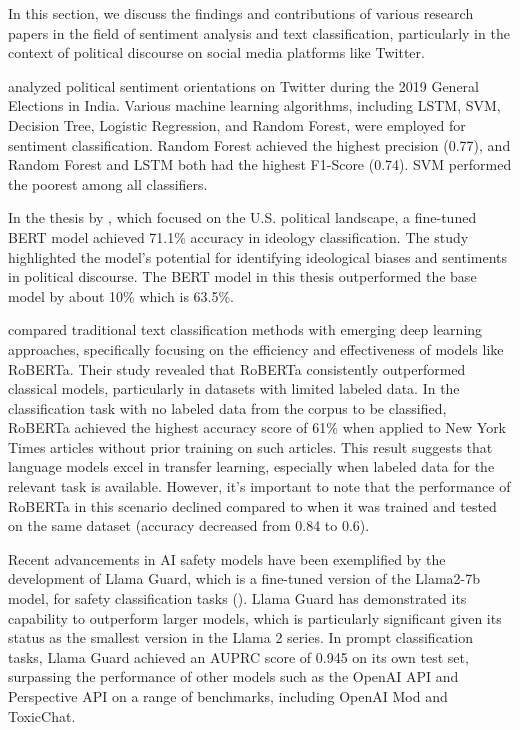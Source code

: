 \documentclass[10pt]{article}
\begin{document}
\begin{multicols}{2}
In this section, we discuss the findings and contributions of various research papers in the field of sentiment analysis and text classification, particularly in the context of political discourse on social media platforms like Twitter.

\cite{ANSARI20201821} analyzed political sentiment orientations on Twitter during the 2019 General Elections in India. Various machine learning algorithms, including LSTM, SVM, Decision Tree, Logistic Regression, and Random Forest, were employed for sentiment classification. Random Forest achieved the highest precision (0.77), and Random Forest and LSTM both had the highest F1-Score (0.74). SVM performed the poorest among all classifiers.

In the thesis by \cite{ahmed2021nlp}, which focused on the U.S. political landscape, a fine-tuned BERT model achieved 71.1\% accuracy in ideology classification. The study highlighted the model's potential for identifying ideological biases and sentiments in political discourse. The BERT model in this thesis outperformed the base model by about 10\% which is 63.5\%.

\cite{Terechshenko2020} compared traditional text classification methods with emerging deep learning approaches, specifically focusing on the efficiency and effectiveness of models like RoBERTa. Their study revealed that RoBERTa consistently outperformed classical models, particularly in datasets with limited labeled data. In the classification task with no labeled data from the corpus to be classified, RoBERTa achieved the highest accuracy score of 61\% when applied to New York Times articles without prior training on such articles. This result suggests that language models excel in transfer learning, especially when labeled data for the relevant task is available. However, it's important to note that the performance of RoBERTa in this scenario declined compared to when it was trained and tested on the same dataset (accuracy decreased from 0.84 to 0.6).

Recent advancements in AI safety models have been exemplified by the development of Llama Guard, which is a fine-tuned version of the Llama2-7b model, for safety classification tasks (\cite{inan2023llamaguard}). Llama Guard has demonstrated its capability to outperform larger models, which is particularly significant given its status as the smallest version in the Llama 2 series. In prompt classification tasks, Llama Guard achieved an AUPRC score of 0.945 on its own test set, surpassing the performance of other models such as the OpenAI API and Perspective API on a range of benchmarks, including OpenAI Mod and ToxicChat.


\end{multicols}
\end{document}
